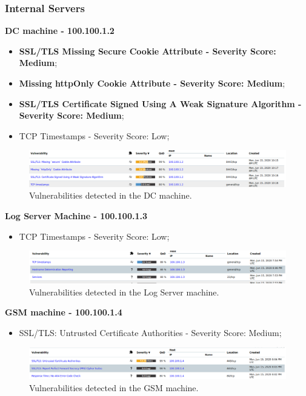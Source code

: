 \subsubsection{Internal Servers}
\textbf{DC machine - 100.100.1.2}
\begin{itemize}
\item \textbf{SSL/TLS Missing Secure Cookie Attribute - Severity Score: Medium};
\item \textbf{Missing httpOnly Cookie Attribute - Severity Score: Medium};
\item \textbf{SSL/TLS Certificate Signed Using A Weak Signature Algorithm - Severity Score: Medium};
\item TCP Timestamps - Severity Score: Low;
\end{itemize}
\begin{figure}[!htb]
\centering
\begin{minipage}{.5\textwidth}
  \centering
  \includegraphics[width=1\textwidth]{dcVulns.png}
  \caption[a]{Vulnerabilities detected in the DC machine.}\label{fig:3}
\end{minipage}%
\end{figure}

\textbf{Log Server Machine - 100.100.1.3}
\begin{itemize}
\item TCP Timestamps - Severity Score: Low;
\end{itemize}
\begin{figure}[!htb]
\centering
\begin{minipage}{.5\textwidth}
  \centering
  \includegraphics[width=1\textwidth]{logServerVulns.png}
  \caption[a]{Vulnerabilities detected in the Log Server machine.}\label{fig:4}
\end{minipage}%
\end{figure}

\textbf{GSM machine - 100.100.1.4}
\begin{itemize}
\item SSL/TLS: Untrusted Certificate Authorities - Severity Score: Medium;
\end{itemize}
\begin{figure}[!htb]
\centering
\begin{minipage}{.5\textwidth}
  \centering
  \includegraphics[width=1\textwidth]{GSM_vulns.png}
  \caption[a]{Vulnerabilities detected in the GSM machine.}\label{fig:5}
\end{minipage}%
\end{figure}


